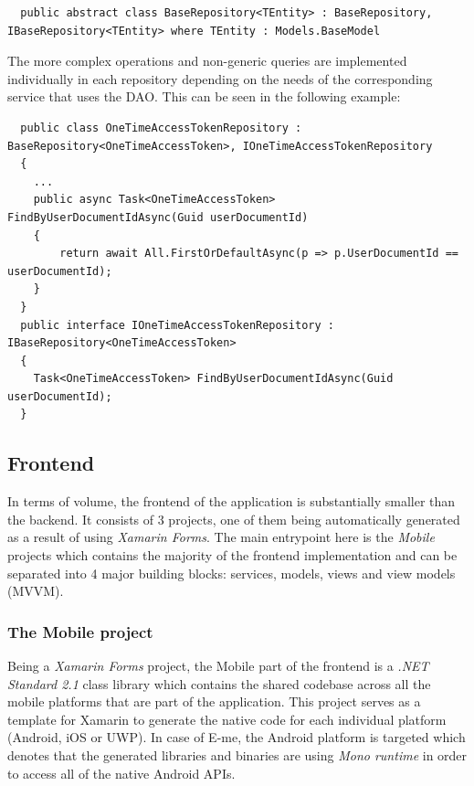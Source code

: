 \begin{lstlisting}
  public abstract class BaseRepository<TEntity> : BaseRepository, IBaseRepository<TEntity> where TEntity : Models.BaseModel
\end{lstlisting}

The more complex operations and non-generic queries are implemented individually in each repository depending on the needs of the corresponding service
that uses the DAO.
This can be seen in the following example:

\begin{lstlisting}
  public class OneTimeAccessTokenRepository : BaseRepository<OneTimeAccessToken>, IOneTimeAccessTokenRepository
  {
	...
    public async Task<OneTimeAccessToken> FindByUserDocumentIdAsync(Guid userDocumentId)
	{
		return await All.FirstOrDefaultAsync(p => p.UserDocumentId == userDocumentId);
	}
  }
  public interface IOneTimeAccessTokenRepository : IBaseRepository<OneTimeAccessToken>
  {
	Task<OneTimeAccessToken> FindByUserDocumentIdAsync(Guid userDocumentId);
  }
\end{lstlisting}

\subsection{Frontend}

In terms of volume, the frontend of the application is substantially smaller than the backend.
It consists of 3 projects, one of them being automatically generated as a result of using \emph{Xamarin Forms}.
The main entrypoint here is the \emph{Mobile} projects which contains the majority of the frontend implementation and can be separated into 
4 major building blocks: services, models, views and view models (MVVM).

\subsubsection{The Mobile project}

Being a \emph{Xamarin Forms} project, the Mobile part of the frontend is a \emph{.NET Standard 2.1} class library which contains the shared codebase across
all the mobile platforms that are part of the application.
This project serves as a template for Xamarin to generate the native code for each individual platform (Android, iOS or UWP).
In case of E-me, the Android platform is targeted which denotes that the generated libraries and binaries are using \emph{Mono runtime}
in order to access all of the native Android APIs.

